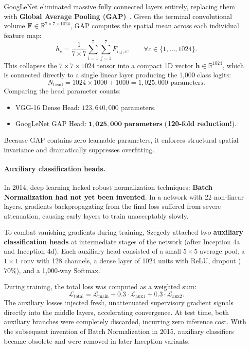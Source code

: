 GoogLeNet eliminated massive fully connected layers entirely, replacing them with \textbf{Global Average Pooling (GAP)}~\cite{lin2013network}. Given the terminal convolutional volume $\mathbf{F} \in \mathbb{R}^{7 \times 7 \times 1024}$, GAP computes the spatial mean across each individual feature map:
\begin{equation}
h_c = \frac{1}{7 \times 7} \sum_{i=1}^7 \sum_{j=1}^7 F_{i, j, c}, \qquad \forall c \in \{1, \dots, 1024\}.
\label{eq:gap_formula_googlenet}
\end{equation}
This collapses the $7 \times 7 \times 1024$ tensor into a compact 1D vector $\mathbf{h} \in \mathbb{R}^{1024}$, which is connected directly to a single linear layer producing the 1,000 class logits:
\begin{equation}
N_{\text{head}} = 1024 \times 1000 + 1000 = 1,025,000 \text{ parameters}.
\end{equation}
Comparing the head parameter counts:
\begin{itemize}[noitemsep]
  \item VGG-16 Dense Head: $123,640,000$ parameters.
  \item GoogLeNet GAP Head: $\mathbf{1,025,000\text{ parameters}}$ (\textbf{120-fold reduction!}).
\end{itemize}
Because GAP contains zero learnable parameters, it enforces structural spatial invariance and dramatically suppresses overfitting.

\paragraph{Auxiliary classification heads.}
In 2014, deep learning lacked robust normalization techniques: \textbf{Batch Normalization had not yet been invented}. In a network with 22 non-linear layers, gradients backpropagating from the final loss suffered from severe attenuation, causing early layers to train unacceptably slowly.

To combat vanishing gradients during training, Szegedy attached two \textbf{auxiliary classification heads} at intermediate stages of the network (after Inception 4a and Inception 4d). Each auxiliary head consisted of a small $5 \times 5$ average pool, a $1 \times 1$ conv with 128 channels, a dense layer of 1024 units with ReLU, dropout ($70\%$), and a 1,000-way Softmax.

During training, the total loss was computed as a weighted sum:
\begin{equation}
\mathcal{L}_{\text{total}} = \mathcal{L}_{\text{main}} + 0.3 \cdot \mathcal{L}_{\text{aux1}} + 0.3 \cdot \mathcal{L}_{\text{aux2}}.
\label{eq:googlenet_auxiliary_loss}
\end{equation}
The auxiliary losses injected fresh, unattenuated supervisory gradient signals directly into the middle layers, accelerating convergence. At test time, both auxiliary branches were completely discarded, incurring zero inference cost. With the subsequent invention of Batch Normalization in 2015, auxiliary classifiers became obsolete and were removed in later Inception variants.

